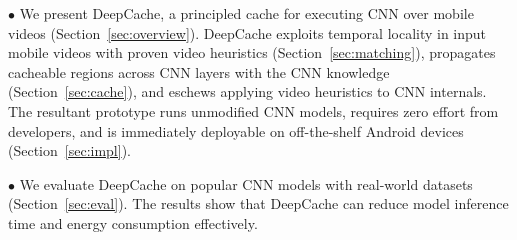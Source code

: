 \documentclass[10pt,acmtog]{acmart}
\newcommand{\framework}{DeepCache\xspace}
\newcommand{\sys}{\framework{}}
\begin{document}
\noindent$\bullet$ We present \framework, a principled cache for executing CNN over mobile videos (Section~\ref{sec:overview}).
\sys{} exploits temporal locality in input mobile videos with proven video heuristics (Section~\ref{sec:matching}), propagates cacheable regions across CNN layers with the CNN knowledge (Section~\ref{sec:cache}), and eschews applying video heuristics to CNN internals.
The resultant prototype runs unmodified CNN models, requires zero effort from developers, and is immediately deployable on off-the-shelf Android devices (Section~\ref{sec:impl}).

\noindent$\bullet$ We evaluate \framework on popular CNN models with real-world datasets (Section~\ref{sec:eval}). The results show that \framework can reduce model inference time and energy consumption effectively.
\end{document}
